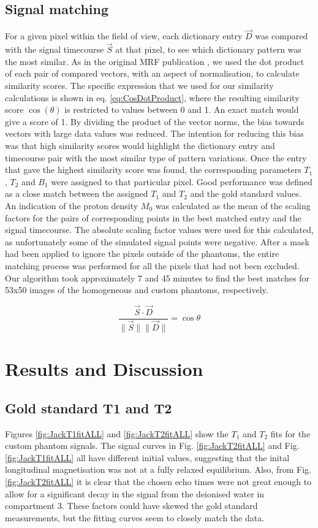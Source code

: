 \documentclass[journal]{IEEEtran}
\newcommand{\norm}[1]{\lVert#1\rVert}
\begin{document}
\subsection{Signal matching} 
For a given pixel within the field of view, each dictionary entry $\vec{D}$  was compared with the signal timecourse $\vec{S}$ at that pixel, to see which dictionary pattern was the most similar. As in the original MRF publication \cite{ma2013magnetic}, we used the dot product of each pair of compared vectors, with an aspect of normalisation, to calculate similarity scores. The specific expression that we used for our similarity calculations is shown in eq. \ref{eq:CosDotProduct}, where the resulting similarity score $\cos(\theta)$ is restricted to values between 0 and 1. An exact match would give a score of 1. By dividing the product of the vector norms, the bias towards vectors with large data values was reduced. The intention for reducing this bias was that high similarity scores would highlight the dictionary entry and timecourse pair with the most similar type of pattern variations. Once the entry that gave the highest similarity score was found, the corresponding parameters $T_1$, $T_2$ and $B_1$ were assigned to that particular pixel. Good performance was defined as a close match between the assigned $T_1$ and $T_2$ and the gold standard values. An indication of the proton density $M_0$ was calculated as the mean of the scaling factors for the pairs of corresponding points in the best matched entry and the signal timecourse. The absolute scaling factor values were used for this calculated, as unfortunately some of the simulated signal points were negative. After a mask had been applied to ignore the pixels outside of the phantoms, the entire matching process was performed for all the pixels that had not been excluded. Our algorithm took approximately 7 and 45 minutes to find the best matches for 53x50 images of the homogeneous and custom phantoms, respectively.

\begin{equation} \label{eq:CosDotProduct}
\frac{\vec{S}\cdot \vec{D}} {\norm{\vec{S}} \norm{\vec{D}}} = \cos{\theta} 
\end{equation}

\section{Results and Discussion}
\subsection{Gold standard T1 and T2}
Figures \ref{fig:JackT1fitALL} and \ref{fig:JackT2fitALL}  show the $T_1$ and $T_2$ fits for the custom phantom signals. The signal curves in Fig. \ref{fig:JackT2fitALL} and Fig. \ref{fig:JackT1fitALL}  all have different initial values, suggesting that the inital longitudinal magnetisation was not at a fully relaxed equilibrium. Also, from Fig. \ref{fig:JackT2fitALL} it is clear that the chosen echo times were not great enough to allow for a significant decay in the signal from the deionised water in compartment 3. These factors could have skewed the gold standard measurements, but the fitting curves seem to closely match the data. 
\end{document}
